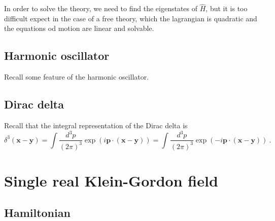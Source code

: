     In order to solve the theory, we need to find the eigenstates of $\hat H$, but it is too difficult expect in the case of a free theory, which the lagrangian is quadratic and the equations od motion are linear and solvable.

\section{Harmonic oscillator}

    Recall some feature of the harmonic oscillator.

\section{Dirac delta}

    Recall that the integral representation of the Dirac delta is 
    \begin{equation}\label{deltaint}
        \delta^3 (\mathbf x - \mathbf y) = \int \frac{d^3 p}{(2\pi)^3} \exp(i \mathbf p \cdot (\mathbf x - \mathbf y)) = \int \frac{d^3 p}{(2\pi)^3} \exp(- i \mathbf p \cdot (\mathbf x - \mathbf y)) ~.
    \end{equation}

\chapter{Single real Klein-Gordon field}

\section{Hamiltonian}

